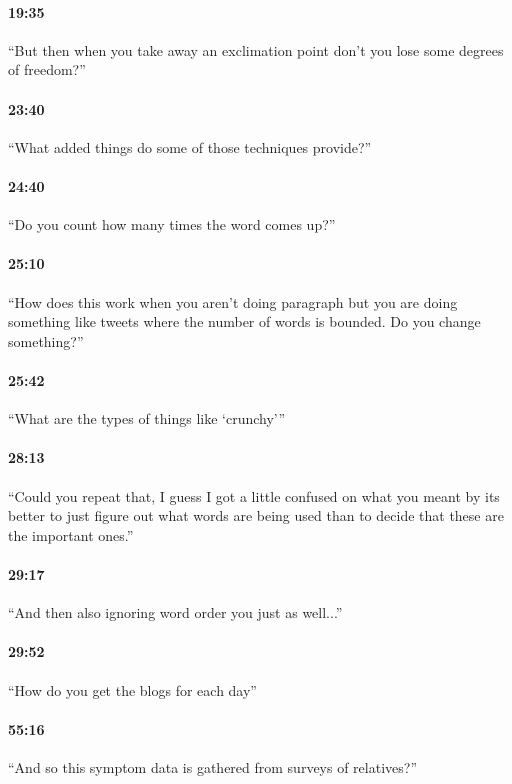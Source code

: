 \documentclass[11pt]{article}
\begin{document}
\paragraph{19:35} ``But then when you take away an exclimation point don't you lose some degrees of freedom?''

\paragraph{23:40} ``What added things do some of those techniques provide?''

\paragraph{24:40} ``Do you count how many times the word comes up?''

\paragraph{25:10} ``How does this work when you aren't doing paragraph but you are doing something like tweets where the number of words is bounded.  Do you change something?''

\paragraph{25:42} ``What are the types of things like `crunchy'''

\paragraph{28:13} ``Could you repeat that, I guess I got a little confused on what you meant by its better to just figure out what words are being used than to decide that these are the important ones.''

\paragraph{29:17} ``And then also ignoring word order you just as well...''

\paragraph{29:52} ``How do you get the blogs for each day'' 

\paragraph{55:16} ``And so this symptom data is gathered from surveys of relatives?''
\end{document}
